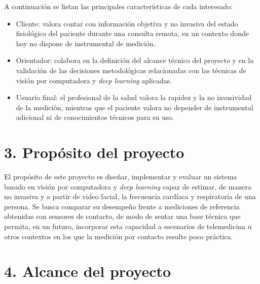 \documentclass[
11pt, %
]{charter}
\begin{document}
	A continuación se listan las principales características de cada interesado:
	
	\begin{itemize}
		\item Cliente: valora contar con información objetiva y no invasiva del estado fisiológico del paciente durante una consulta remota, en un contexto donde hoy no dispone de instrumental de medición.
		\item Orientador: colabora en la definición del alcance técnico del proyecto y en la validación de las decisiones metodológicas relacionadas con las técnicas de visión por computadora y \textit{deep learning} aplicadas.
		\item Usuario final: el profesional de la salud valora la rapidez y la no invasividad de la medición, mientras que el paciente valora no depender de instrumental adicional ni de conocimientos técnicos para su uso.
	\end{itemize}
	
	\section{3. Propósito del proyecto}
	\label{sec:proposito}
	
	El propósito de este proyecto es diseñar, implementar y evaluar un sistema basado en visión por computadora y \textit{deep learning} capaz de estimar, de manera no invasiva y a partir de video facial, la frecuencia cardíaca y respiratoria de una persona. Se busca comparar su desempeño frente a mediciones de referencia obtenidas con sensores de contacto, de modo de sentar una base técnica que permita, en un futuro, incorporar esta capacidad a escenarios de telemedicina u otros contextos en los que la medición por contacto resulte poco práctica.
	
	\section{4. Alcance del proyecto}
	\label{sec:alcance}
	
\end{document}
